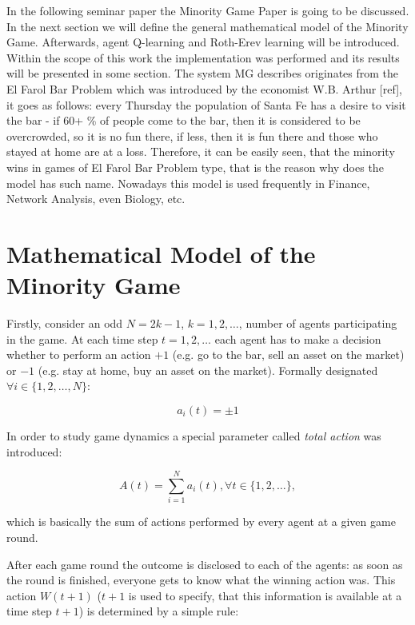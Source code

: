 \documentclass[11pt,american,czech]{article}
\begin{document}
In the following seminar paper the Minority Game Paper is going to be discussed. In the next section we will define the general mathematical model of the Minority Game. Afterwards, agent Q-learning and Roth-Erev learning will be introduced. Within the scope of this work the implementation was performed and its results will be presented in some section. 
The system MG describes originates from the El Farol Bar Problem which was introduced by the economist W.B. Arthur [ref], it goes as follows: every Thursday the population of Santa Fe has a desire to visit the bar - if 60+ \%  of people come to the bar, then it is considered to be overcrowded, so it is no fun there, if less, then it is fun there and those who stayed at home are at a loss. Therefore, it can be easily seen, that the minority wins in games of El Farol Bar Problem type, that is the reason why does the model has such name. Nowadays this model is used frequently in Finance, Network Analysis, even Biology, etc.

\section{Mathematical Model of the Minority Game}

Firstly, consider an odd $N=2k-1$, $k=1,2,\dots$, number of agents participating in the game. At each time step $t=1,2,\dots$ each agent has to make a decision whether to perform an action $+1$ (e.g. go to the bar, sell an asset on the market) or $-1$ (e.g. stay at home, buy an asset on the market). Formally designated $\forall i\in\{1,2,\dots,N\}$:

\begin{equation}
a_{i}(t)=\pm 1
\end{equation}

In order to study game dynamics a special parameter called \textit{total action} was introduced: 

\begin{equation}
A(t)=\sum_{i=1}^{N}a_{i}(t), \forall t\in\{1,2,\dots\},
\end{equation}

\noindent
which is basically the sum of actions performed by every agent at a given game round.

\medskip

After each game round the outcome is disclosed to each of the agents: as soon as the round is finished, everyone gets to know what the winning action was. This action $W(t+1)$ ($t+1$ is used to specify, that this information is available at a time step $t+1$) is determined by a simple rule:
\end{document}
